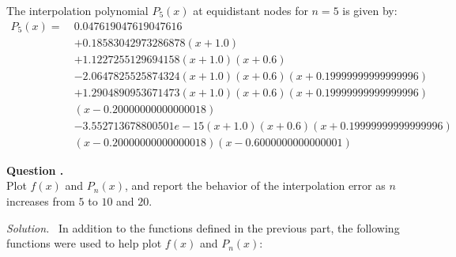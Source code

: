 \documentclass[12pt]{article}
\newcounter{question}
\newcounter{subquest}
\newcommand{\subquestion}{
    \stepcounter{subquest} 
    \vspace{.5em}
    \textbf{\large Question \thequestion.\thesubquest}
    \vspace{.25em}\ \\}
\newcommand{\solution}
    {\par\vspace{0.5em}\noindent\emph{Solution.}\ }
    {\par\vspace{1em}}
\begin{document}
The interpolation polynomial $P_5(x)$ at equidistant nodes for $n=5$ is given by:
\begin{align*}
    P_{5}(x) = \ & 0.047619047619047616 \\
        &+ 0.18583042973286878(x + 1.0) \\
        &+ 1.1227255129694158(x + 1.0)(x + 0.6) \\
        &- 2.0647825525874324(x + 1.0)(x + 0.6)(x + 0.19999999999999996) \\
        &+ 1.2904890953671473(x + 1.0)(x + 0.6)(x + 0.19999999999999996)\\
        &(x - 0.20000000000000018) \\
        &- 3.552713678800501e-15(x + 1.0)(x + 0.6)(x + 0.19999999999999996)\\
        &(x - 0.20000000000000018)(x - 0.6000000000000001)
\end{align*}

\newpage
\subquestion
Plot $f(x)$ and $P_n(x)$, and report the behavior of the interpolation error as $n$ increases from $5$ to $10$ and $20$.

\solution 
In addition to the functions defined in the previous part, the following functions were used to help plot $f(x)$ and $P_n(x)$:
\end{document}
